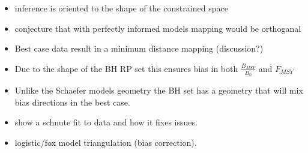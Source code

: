 \documentclass[12pt]{article}
\begin{document}
\begin{itemize}
\item inference is oriented to the shape of the constrained space
\item conjecture that with perfectly informed models mapping would be orthoganal

\item Best case data result in a minimum distance mapping (discussion?)
\item Due to the shape of the BH RP set this ensures bias in both $\frac{B_{MSY}}{B_0}$ and $F_{MSY}$
\item Unlike the Schaefer models geometry the BH set has a geometry that will mix bias directions in the best case.

\item show a schnute fit to data and how it fixes issues.
\item logistic/fox model triangulation (bias correction).

\end{itemize}
\end{document}
